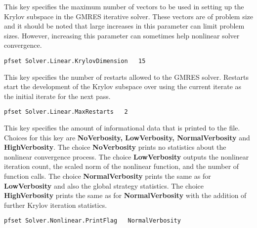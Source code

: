 {This key specifies the maximum number of vectors to be used in setting up the
Krylov subspace in the GMRES iterative solver.  These vectors are of problem
size and it should be noted that large increases in this parameter can limit
problem sizes.  However, increasing this parameter can sometimes help nonlinear
solver convergence.
}
\begin{display}\begin{verbatim}
pfset Solver.Linear.KrylovDimension   15
\end{verbatim}\end{display}

{This key specifies the number of restarts allowed to the GMRES solver.
Restarts start the development of the Krylov subspace over using the current
iterate as the initial iterate for the next pass.
}
\begin{display}\begin{verbatim}
pfset Solver.Linear.MaxRestarts   2
\end{verbatim}\end{display}

{This key specifies the amount of informational data that is printed to the
 file.  Choices for this key are {\bf NoVerbosity, 
LowVerbosity, NormalVerbosity} and {\bf  HighVerbosity}.  The choice 
{\bf NoVerbosity} prints no statistics about the nonlinear convergence
process.  The choice {\bf LowVerbosity} outputs the nonlinear iteration count, 
the scaled norm of the nonlinear function, and the number of function calls.
The choice {\bf NormalVerbosity} prints the same as for {\bf LowVerbosity} 
and also the global strategy statistics.  The choice {\bf HighVerbosity} prints
the same as for {\bf NormalVerbosity} with the addition of further Krylov 
iteration statistics.
}
\begin{display}\begin{verbatim}
pfset Solver.Nonlinear.PrintFlag   NormalVerbosity
\end{verbatim}\end{display}

